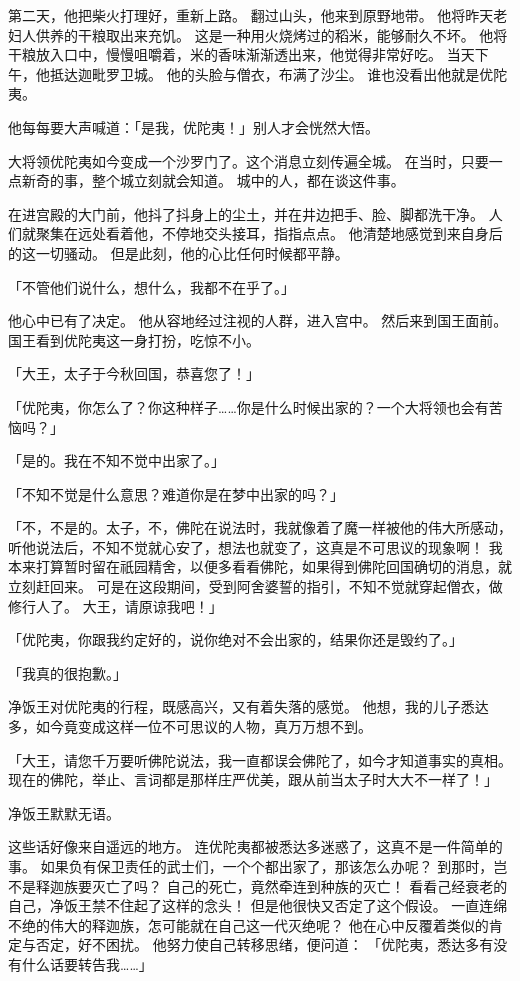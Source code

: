 \documentclass[twoside,openany]{book}
\begin{document}
第二天，他把柴火打理好，重新上路。
翻过山头，他来到原野地带。
他将昨天老妇人供养的干粮取出来充饥。
这是一种用火烧烤过的稻米，能够耐久不坏。
他将干粮放入口中，慢慢咀嚼着，米的香味渐渐透出来，他觉得非常好吃。
当天下午，他抵达迦毗罗卫城。
他的头脸与僧衣，布满了沙尘。
谁也没看出他就是优陀夷。

他每每要大声喊道：「是我，优陀夷！」别人才会恍然大悟。

大将领优陀夷如今变成一个沙罗门了。这个消息立刻传遍全城。
在当时，只要一点新奇的事，整个城立刻就会知道。
城中的人，都在谈这件事。

在进宫殿的大门前，他抖了抖身上的尘土，并在井边把手、脸、脚都洗干净。
人们就聚集在远处看着他，不停地交头接耳，指指点点。
他清楚地感觉到来自身后的这一切骚动。
但是此刻，他的心比任何时候都平静。

「不管他们说什么，想什么，我都不在乎了。」

他心中已有了决定。
他从容地经过注视的人群，进入宫中。
然后来到国王面前。
国王看到优陀夷这一身打扮，吃惊不小。

「大王，太子于今秋回国，恭喜您了！」

「优陀夷，你怎么了？你这种样子……你是什么时候出家的？一个大将领也会有苦恼吗？」

「是的。我在不知不觉中出家了。」

「不知不觉是什么意思？难道你是在梦中出家的吗？」

「不，不是的。太子，不，佛陀在说法时，我就像着了魔一样被他的伟大所感动，听他说法后，不知不觉就心安了，想法也就变了，这真是不可思议的现象啊！
我本来打算暂时留在祇园精舍，以便多看看佛陀，如果得到佛陀回国确切的消息，就立刻赶回来。
可是在这段期间，受到阿舍婆誓的指引，不知不觉就穿起僧衣，做修行人了。
大王，请原谅我吧！」

「优陀夷，你跟我约定好的，说你绝对不会出家的，结果你还是毁约了。」

「我真的很抱歉。」

净饭王对优陀夷的行程，既感高兴，又有着失落的感觉。
他想，我的儿子悉达多，如今竟变成这样一位不可思议的人物，真万万想不到。

「大王，请您千万要听佛陀说法，我一直都误会佛陀了，如今才知道事实的真相。
现在的佛陀，举止、言词都是那样庄严优美，跟从前当太子时大大不一样了！」

净饭王默默无语。

这些话好像来自遥远的地方。
连优陀夷都被悉达多迷惑了，这真不是一件简单的事。
如果负有保卫责任的武士们，一个个都出家了，那该怎么办呢？
到那时，岂不是释迦族要灭亡了吗？
自己的死亡，竟然牵连到种族的灭亡！
看看己经衰老的自己，净饭王禁不住起了这样的念头！
但是他很快又否定了这个假设。
一直连绵不绝的伟大的释迦族，怎可能就在自己这一代灭绝呢？
他在心中反覆着类似的肯定与否定，好不困扰。
他努力使自己转移思绪，便问道：
「优陀夷，悉达多有没有什么话要转告我……」
\end{document}
